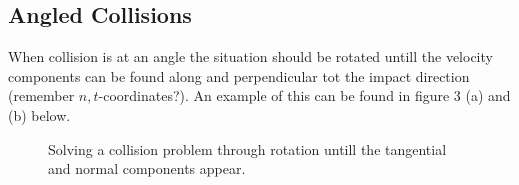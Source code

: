\documentclass[11pt, a4paper]{article}
\begin{document}
\subsection{Angled Collisions}
When collision is at an angle the situation should be rotated untill the velocity components can be found 
along and perpendicular tot the impact direction (remember $n,t$-coordinates?).
An example of this can be found in figure 3 (a) and (b) below.
\begin{figure}[h]
  \centering
  \qquad
  \caption{Solving a collision problem through rotation untill the tangential and normal components appear.}
\end{figure}
\end{document}
